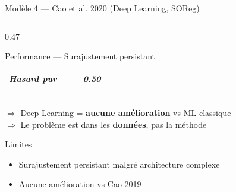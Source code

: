 \documentclass[aspectratio=169]{beamer}
\newcommand{\tightlist}{%
  \setlength{\itemsep}{1pt}\setlength{\parskip}{0pt}%
  \setlength{\parsep}{0pt}\setlength{\topsep}{2pt}}
\begin{document}
\begin{frame}[shrink=5]{Modèle 4 --- Cao et al. 2020 (Deep Learning, SOReg)}
\begin{columns}[T]
\begin{column}{0.47\textwidth}
\begin{alertblock}{Performance --- Surajustement persistant}
\begin{tabular}{lcc}
          \textit{Hasard pur} & \textit{---} & \textit{0.50} \\
          \bottomrule
        \end{tabular}
        \vspace{3pt}\\
        $\Rightarrow$ Deep Learning = \textbf{aucune amélioration} vs ML classique\\
        $\Rightarrow$ Le problème est dans les \textbf{données}, pas la méthode
      \end{alertblock}
      \vspace{0.2em}
      \begin{alertblock}{Limites}
        \footnotesize\tightlist
        \begin{itemize}\tightlist
          \item Surajustement persistant malgré architecture complexe
          \item Aucune amélioration vs Cao 2019
        \end{itemize}
      \end{alertblock}
    \end{column}
  \end{columns}
\end{frame}
\end{document}
